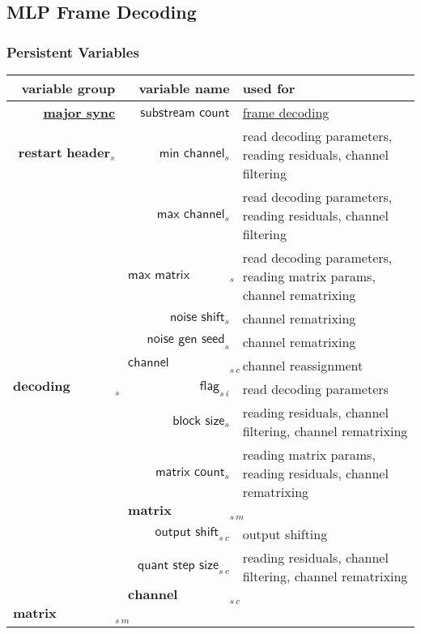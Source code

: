 \begin{landscape}

\subsection{MLP Frame Decoding}
\subsubsection{Persistent Variables}
{
\begin{tabular}{rrl}
\textbf{variable group} & \textbf{variable name} &
\textbf{used for} \\
\hline
\hline
\hyperref[mlp:readmajorsync]{\textbf{major sync}}
& $\textsf{substream count}$
& \hyperref[mlp:framedecoding]{frame decoding} \\
\hline
\hyperref[mlp:readrestartheader]{$\textbf{restart header}_s$}
& $\textsf{min channel}_s$
& read decoding parameters, reading residuals, channel filtering \\
& $\textsf{max channel}_s$
& read decoding parameters, reading residuals, channel filtering \\
& $\textsf{max matrix channel}_s$
& read decoding parameters, reading matrix params, channel rematrixing \\
& $\textsf{noise shift}_s$
& channel rematrixing \\
& $\textsf{noise gen seed}_s$
& channel rematrixing \\
& $\textsf{channel assignment}_{s~c}$
& channel reassignment \\
\hline
\hyperref[mlp:readdecodingparams]{$\textbf{decoding parameters}_s$}
& $\textsf{flag}_{s~i}$
& read decoding parameters \\
& $\textsf{block size}_s$
& reading residuals, channel filtering, channel rematrixing \\
& $\textsf{matrix count}_s$
& reading matrix params, reading residuals, channel rematrixing \\
& \hyperref[mlp:readmatrixparams]{$\textbf{matrix parameters}_{s~m}$} \\
& $\textsf{output shift}_{s~c}$
& output shifting \\
& $\textsf{quant step size}_{s~c}$
& reading residuals, channel filtering, channel rematrixing \\
& \hyperref[mlp:readchannelparams]{$\textbf{channel parameters}_{s~c}$} \\
\hline
\hyperref[mlp:readmatrixparams]{$\textbf{matrix parameters}_{s~m}$}

\end{tabular}}
\end{landscape}
